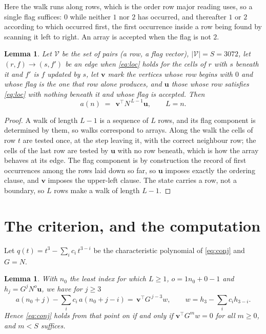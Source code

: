 \documentclass[11pt,a4paper]{article}
\theoremstyle{plain}
\newtheorem{lemma}[theorem]{Lemma}
\theoremstyle{definition}
\begin{document}
Here the walk runs along rows, which is the order row
major reading uses, so a single flag suffices: $0$ while neither $1$ nor $2$ has
occurred, and thereafter $1$ or $2$ according to which occurred first, the first occurrence
inside a row being found by scanning it left to right. An array is accepted when the flag
is not $2$.

\begin{lemma}\label{lem:walk}
Let $\mathcal V$ be the set of pairs (a row, a flag vector), $|\mathcal V|=S=3072$, let
$(r,f)\to(s,f')$ be an edge when \eqref{eq:loc} holds for the cells of $r$ with $s$ beneath
it and $f'$ is $f$ updated by $s$, let $\mathbf{v}$ mark the vertices whose row begins
with $0$ and whose flag is the one that row alone produces, and $\mathbf{u}$ those whose
row satisfies \eqref{eq:loc} with nothing beneath it and whose flag is accepted. Then
\[
a(n)\;=\;\,\mathbf{v}^{\!\top}N^{\,L-1}\mathbf{u},\qquad L=n.
\]
\end{lemma}

\begin{proof}
A walk of length $L-1$ is a sequence of $L$ rows, and its flag component is determined by
them, so walks correspond to arrays. Along the walk the cells of row $t$ are tested once,
at the step leaving it, with the correct neighbour row; the cells of the last row are
tested by $\mathbf{u}$ with no row beneath, which is how the array behaves at its edge.
The flag component is by construction the record of first occurrences among the rows laid
down so far, so $\mathbf{u}$ imposes exactly the ordering clause, and $\mathbf{v}$ imposes
the upper-left clause. The state carries a row, not a boundary, so $L$ rows make a walk
of length $L-1$.
\end{proof}

\section{The criterion, and the computation}

Let $q(t)=t^{3}-\sum_i c_i\,t^{3-i}$ be the characteristic polynomial of
\eqref{eq:conj} and $G=N$.

\begin{lemma}\label{lem:crit}
With $n_0$ the least index for which $L\ge1$, $o=1n_0+0-1$ and
$h_j=G^{j}N^{o}\mathbf{u}$, we have for $j\ge3$
\[
a(n_0+j)-\sum_i c_i\,a(n_0+j-i)=\,\mathbf{v}^{\!\top}G^{\,j-3}w,
\qquad w=h_{3}-\sum_i c_ih_{3-i} .
\]
Hence \eqref{eq:conj} holds from that point on if and only if
$\mathbf{v}^{\!\top}G^{m}w=0$ for all $m\ge0$, and $m<S$ suffices.
\end{lemma}
\end{document}
